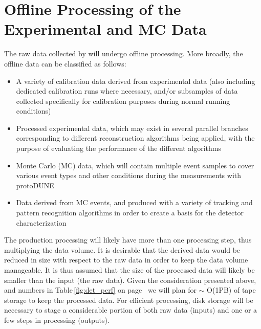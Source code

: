 \section{Offline Processing of the Experimental and MC Data}
\label{sec:protodune-offline}

The raw data collected by \pd will undergo offline processing. More broadly, the offline data
can be classified as follows:
\begin{itemize}

\item A variety of calibration data derived from experimental data (also including dedicated calibration
runs where necessary, and/or subsamples of data collected specifically for calibration
purposes during normal running conditions)

\item Processed experimental data, which may exist in several parallel branches corresponding to
different reconstruction algorithms being applied, with the purpose of evaluating the performance
of the different algorithms

\item Monte Carlo (MC) data, which will contain multiple event samples to cover various event types
and other conditions during the measurements with protoDUNE

\item Data derived from MC events, and produced with a variety of tracking and pattern recognition algorithms
in order to create a basis for the detector characterization

\end{itemize}

\noindent The production processing will likely have more than one processing step,
thus multiplying the data volume. It is desirable that the derived data would be reduced
in size with respect to the raw data in order to keep the data volume manageable.
It is thus assumed that the size of the processed data will likely be smaller than the input (the raw data). 
Given the consideration presented above, and numbers in Table\,\ref{fig:det_perf}
on page~\pageref{fig:det_perf} we will plan for
$\sim$ O(1PB) of tape storage to keep the processed data. 
For efficient processing, disk storage will be necessary
to stage a considerable portion of both raw data (inputs) and one or a few steps in processing (outputs).

